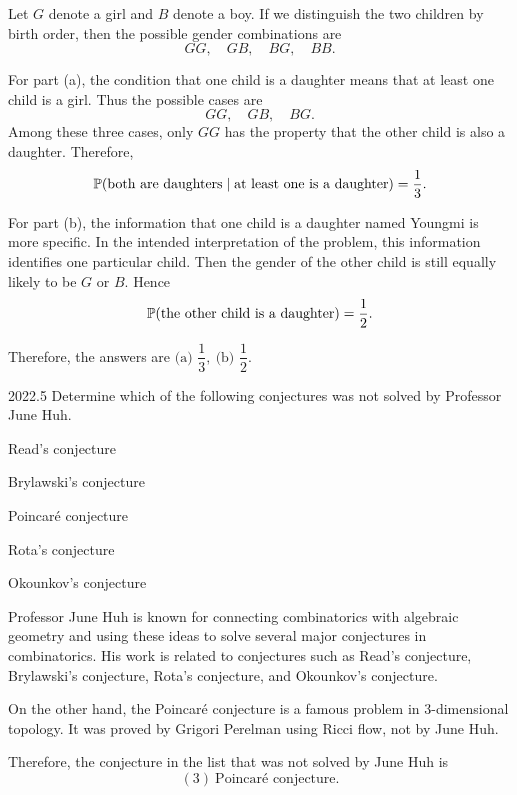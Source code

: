     \begin{solution}
        Let $G$ denote a girl and $B$ denote a boy. If we distinguish the two children by birth
        order, then the possible gender combinations are
        \[
            GG,\quad GB,\quad BG,\quad BB.
        \]

        For part (a), the condition that one child is a daughter means that at least one child is a
        girl. Thus the possible cases are
        \[
            GG,\quad GB,\quad BG.
        \]
        Among these three cases, only $GG$ has the property that the other child is also a daughter.
        Therefore,
        \[
            \mathbb{P}(\text{both are daughters}\mid \text{at least one is a daughter})
            =
            \frac{1}{3}.
        \]

        For part (b), the information that one child is a daughter named Youngmi is more specific.
        In the intended interpretation of the problem, this information identifies one particular
        child. Then the gender of the other child is still equally likely to be $G$ or $B$. Hence
        \[
            \mathbb{P}(\text{the other child is a daughter})
            =
            \frac{1}{2}.
        \]

        Therefore, the answers are $\boxed{\text{(a) } \dfrac{1}{3},\ \text{(b) } \dfrac{1}{2}}$.
    \end{solution}

    \begin{pastproblem}{2022.5}
        Determine which of the following conjectures was not solved by Professor June Huh.
        \begin{problemchoices}
            \item Read's conjecture
            \item Brylawski's conjecture
            \item Poincaré conjecture
            \item Rota's conjecture
            \item Okounkov's conjecture
        \end{problemchoices}
    \end{pastproblem}

    \begin{solution}
        Professor June Huh is known for connecting combinatorics with algebraic geometry and using
        these ideas to solve several major conjectures in combinatorics. His work is related to
        conjectures such as Read's conjecture, Brylawski's conjecture, Rota's conjecture, and
        Okounkov's conjecture.

        On the other hand, the Poincaré conjecture is a famous problem in $3$-dimensional topology.
        It was proved by Grigori Perelman using Ricci flow, not by June Huh.

        Therefore, the conjecture in the list that was not solved by June Huh is
        \[
            \boxed{(3)\ \text{Poincaré conjecture}}.
        \]
    \end{solution}

